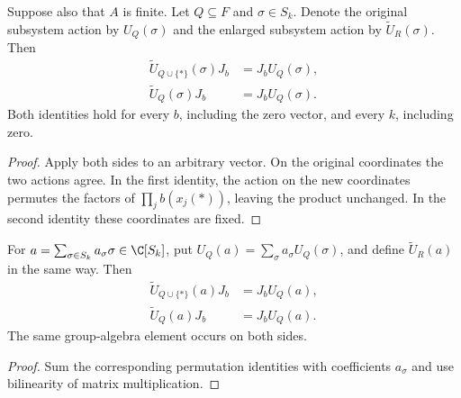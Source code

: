 \begin{theorem}
    \label{thm:added_site_tensor_insertion_permutations}
    \leanok
    Suppose also that $A$ is finite. Let $Q\subseteq F$ and
    $\sigma\in S_k$. Denote the original subsystem action by $U_Q(\sigma)$
    and the enlarged subsystem action by $\widetilde U_R(\sigma)$.
    Then
    \begin{align*}
        \widetilde U_{Q\cup\{*\}}(\sigma)J_b&=J_bU_Q(\sigma),\\
        \widetilde U_Q(\sigma)J_b&=J_bU_Q(\sigma).
    \end{align*}
    Both identities hold for every $b$, including the zero vector,
    and every $k$, including zero.
\end{theorem}
\begin{proof}
    \leanok
    Apply both sides to an arbitrary vector. On the original coordinates
    the two actions agree. In the first identity, the action on the new
    coordinates permutes the factors of $\prod_j b(x_j(*))$, leaving the
    product unchanged. In the second identity these coordinates are fixed.
\end{proof}

\begin{theorem}
    \label{thm:added_site_tensor_insertion_group_algebra}
    \leanok
    For $a=\sum_{\sigma\in S_k}a_\sigma\sigma\in\C[S_k]$, put
    $U_Q(a)=\sum_\sigma a_\sigma U_Q(\sigma)$, and define
    $\widetilde U_R(a)$ in the same way. Then
    \begin{align*}
        \widetilde U_{Q\cup\{*\}}(a)J_b&=J_bU_Q(a),\\
        \widetilde U_Q(a)J_b&=J_bU_Q(a).
    \end{align*}
    The same group-algebra element occurs on both sides.
\end{theorem}
\begin{proof}
    \leanok
    Sum the corresponding permutation identities with coefficients
    $a_\sigma$ and use bilinearity of matrix multiplication.
\end{proof}

